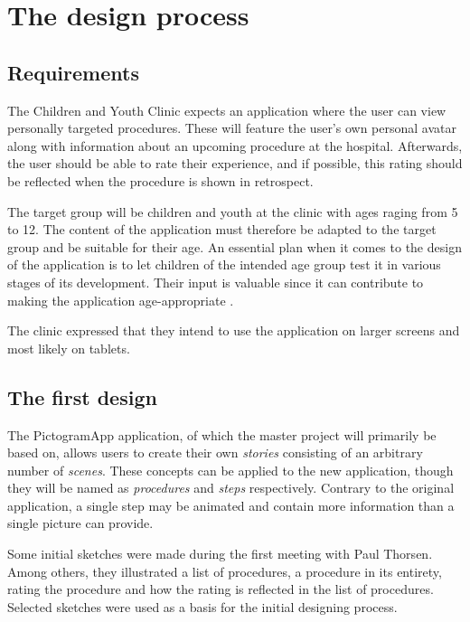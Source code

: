 \chapter{The design process}
\label{ch:design}

\section{Requirements}

The Children and Youth Clinic expects an application where the user can view personally targeted procedures. These will feature the user's own personal avatar along with information about an upcoming procedure at the hospital. Afterwards, the user should be able to rate their experience, and if possible, this rating should be reflected when the procedure is shown in retrospect.

The target group will be children and youth at the clinic with ages raging from 5 to 12. The content of the application must therefore be adapted to the target group and be suitable for their age. An essential plan when it comes to the design of the application is to let children of the intended age group test it in various stages of its development. Their input is valuable since it can contribute to making the application age-appropriate \parencite{stalberg2016}.

The clinic expressed that they intend to use the application on larger screens and most likely on tablets.

\section{The first design}

The PictogramApp application, of which the master project will primarily be based on, allows users to create their own \emph{stories} consisting of an arbitrary number of \emph{scenes}. These concepts can be applied to the new application, though they will be named as \emph{procedures} and \emph{steps} respectively. Contrary to the original application, a single step may be animated and contain more information than a single picture can provide.

Some initial sketches were made during the first meeting with Paul Thorsen. Among others, they illustrated a list of procedures, a procedure in its entirety, rating the procedure and how the rating is reflected in the list of procedures. Selected sketches were used as a basis for the initial designing process.

